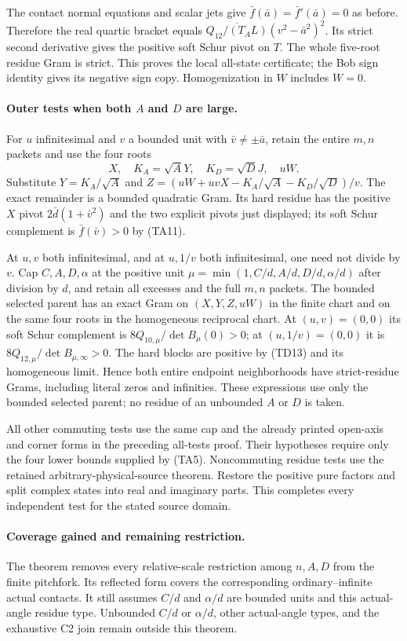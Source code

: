 The contact normal equations and scalar jets give
$\bar f(\bar a)=\bar f'(\bar a)=0$ as before. Therefore the real
quartic bracket equals
$\overline{Q_{12}/(T_A L)}(v^2-\bar a^2)^2$.
Its strict second derivative gives the positive soft Schur pivot on
$T$. The whole five-root residue Gram is strict. This proves the
local all-state certificate; the Bob sign identity gives its negative
sign copy. Homogenization in $W$ includes $W=0$.

\paragraph{Outer tests when both $A$ and $D$ are large.}
For $u$ infinitesimal and $v$ a bounded unit with
$\bar v\ne\pm\bar a$, retain the entire $m,n$ packets and use the
four roots
\[
 X,\quad K_A=\sqrt A Y,\quad K_D=\sqrt D J,\quad uW.
\]
Substitute $Y=K_A/\sqrt A$ and
$Z=(uW+uvX-K_A/\sqrt A-K_D/\sqrt D)/v$.
The exact remainder is a bounded quadratic Gram. Its hard residue
has the positive $X$ pivot $2\bar d(1+\bar v^2)$ and the two
explicit pivots just displayed; its soft Schur complement is
$\bar f(\bar v)>0$ by (TA11).

At $u,v$ both infinitesimal, and at $u,1/v$ both infinitesimal,
one need not divide by $v$. Cap $C,A,D,\alpha$ at the positive
unit $\mu=\min(1,C/d,A/d,D/d,\alpha/d)$ after division by $d$,
and retain all excesses and the full $m,n$ packets. The bounded
selected parent has an exact Gram on $(X,Y,Z,uW)$ in the finite
chart and on the same four roots in the homogeneous reciprocal
chart. At $(u,v)=(0,0)$ its soft Schur complement is
$8Q_{10,\mu}/\det B_\mu(0)>0$; at $(u,1/v)=(0,0)$ it is
$8Q_{12,\mu}/\det B_{\mu,\infty}>0$. The hard blocks are positive
by (TD13) and its homogeneous limit. Hence both entire endpoint
neighborhoods have strict-residue Grams, including literal zeros
and infinities. These expressions use only the bounded selected
parent; no residue of an unbounded $A$ or $D$ is taken.

All other commuting tests use the same cap and the already printed
open-axis and corner forms in the preceding all-tests proof. Their
hypotheses require only the four lower bounds supplied by (TA5).
Noncommuting residue tests use the retained arbitrary-physical-source
theorem. Restore the positive pure factors and split complex states
into real and imaginary parts. This completes every independent
test for the stated source domain.

\paragraph{Coverage gained and remaining restriction.}
The theorem removes every relative-scale restriction among $n,A,D$
from the finite pitchfork. Its reflected form covers the corresponding
ordinary--infinite actual contacts. It still assumes $C/d$ and
$\alpha/d$ are bounded units and this actual-angle residue type.
Unbounded $C/d$ or $\alpha/d$, other actual-angle types, and the
exhaustive C2 join remain outside this theorem.
